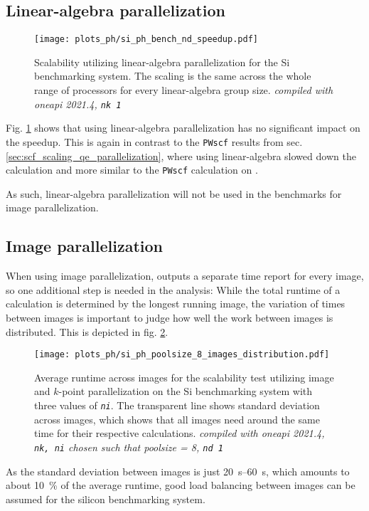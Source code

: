 \documentclass[main.tex]{subfiles}
\begin{document}
\subsection{Linear-algebra parallelization}

\begin{figure}[htb!]
    \centering
    \texttt{[image: plots\_ph/si\_ph\_bench\_nd\_speedup.pdf]}
    \caption{Scalability utilizing linear-algebra parallelization for the Si benchmarking system. The scaling is the same across the whole range of processors for every linear-algebra group size. \emph{\QE compiled with \gls{oneapi} 2021.4, \texttt{nk 1}}}
    \label{fig:scaling_ph_nd_si}
\end{figure}
Fig. \ref{fig:scaling_ph_nd_si} shows that using linear-algebra parallelization has no significant impact on the speedup.
This is again in contrast to the \texttt{PWscf} results from sec. \ref{sec:scf_scaling_qe_parallelization}, where using linear-algebra slowed down the calculation and more similar to the \texttt{PWscf} calculation on \TaS.

As such, linear-algebra parallelization will not be used in the benchmarks for image parallelization.

\subsection{Image parallelization}\label{sub:scaling_ph_images}

When using image parallelization, \QE outputs a separate time report for every image, so one additional step is needed in the analysis:
While the total runtime of a calculation is determined by the longest running image, the variation of times between images is important to judge how well the work between images is distributed.
This is depicted in fig. \ref{fig:scaling_ph_ni_poolsize_8_si_distribution}.

\begin{figure}[htb!]
    \centering
    \texttt{[image: plots\_ph/si\_ph\_poolsize\_8\_images\_distribution.pdf]}
    \caption{Average runtime across images for the scalability test utilizing image and \(k\)-point parallelization on the Si benchmarking system with three values of \emph{\texttt{ni}}. The transparent line shows standard deviation across images, which shows that all images need around the same time for their respective calculations. \emph{\QE compiled with \gls{oneapi} 2021.4, \texttt{nk, ni} chosen such that poolsize = 8, \texttt{nd 1}}}
    \label{fig:scaling_ph_ni_poolsize_8_si_distribution}
\end{figure}
As the standard deviation between images is just \SIrange{20}{60}{\s}, which amounts to about \SI{10}{\percent} of the average runtime, good load balancing between images can be assumed for the silicon benchmarking system.
\end{document}
